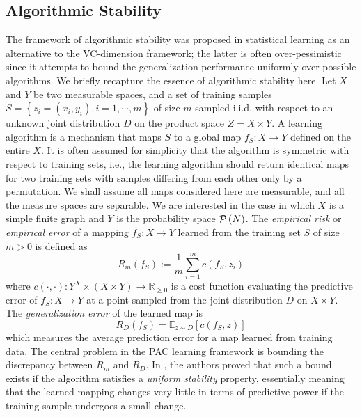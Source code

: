 \documentclass[letterpaper]{article} %
\begin{document}
\subsection{Algorithmic Stability}  
The framework of algorithmic stability \cite{DW1979,Algorithmic_Stability,MNPR2006} was proposed in statistical learning as an alternative to the VC-dimension framework; the latter is often over-pessimistic since it attempts to bound the generalization performance uniformly over possible algorithms. We briefly recapture the essence of algorithmic stability here. Let $X$ and $Y$ be two measurable spaces, and a set of training samples $S=\left\{ z_i=\left( x_i,y_i \right),i=1,\cdots,m \right\}$ of size $m$ sampled i.i.d. with respect to an unknown joint distribution $D$ on the product space $Z=X\times Y$. A learning algorithm is a mechanism that maps $S$ to a global map $f_S:X\rightarrow Y$ defined on the entire $X$. It is often assumed for simplicity that the algorithm is symmetric with respect to training sets, i.e., the learning algorithm should return identical maps for two training sets with samples differing from each other only by a permutation. We shall assume all maps considered here are measurable, and all the measure spaces are separable. We are interested in the case in which $X$ is a simple finite graph and $Y$ is the probability space $\P\left( N \right)$. The \emph{empirical risk} or \emph{empirical error} of a mapping $f_S:X\rightarrow Y$ learned from the training set $S$ of size $m>0$ is defined as
\begin{equation*}
  R_m \left( f_S \right):=\frac{1}{m}\sum_{i=1}^mc \left( f_S, z_i \right)
\end{equation*}
where $c \left( \cdot,\cdot \right):Y^X\times \left( X\times Y \right)\rightarrow\mathbb{R}_{\geq0}$ is a cost function evaluating the predictive error of $f_S:X\rightarrow Y$ at a point sampled from the joint distribution $D$ on $X\times Y$. The \emph{generalization error} of the learned map is
\begin{equation*}
  R_D \left( f_S \right)=\mathbb{E}_{z\sim D} \left[ c \left( f_S,z \right) \right]
\end{equation*}
which measures the average prediction error for a map learned from training data. The central problem in the PAC learning framework is bounding the discrepancy between $R_m$ and $R_D$. In \cite{Algorithmic_Stability}, the authors proved that such a bound exists if the algorithm satisfies a \emph{uniform stability} property, essentially meaning that the learned mapping changes very little in terms of predictive power if the training sample undergoes a small change.
\end{document}
